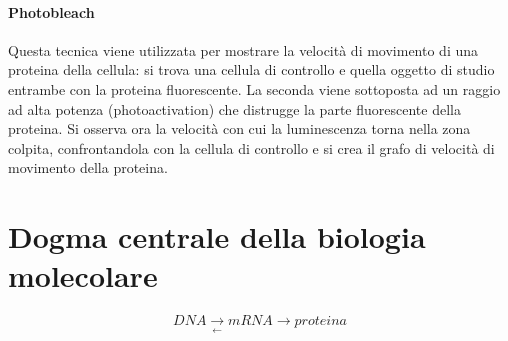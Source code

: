 \paragraph{Photobleach}
Questa tecnica viene utilizzata per mostrare la velocit\`a di movimento di una proteina della cellula: si trova una cellula di controllo e quella oggetto di 
studio entrambe con la proteina fluorescente. La seconda viene sottoposta ad un raggio ad alta potenza (photoactivation) che distrugge la parte fluorescente
della proteina. Si osserva ora la velocit\`a con cui la luminescenza torna nella zona colpita, confrontandola con la cellula di controllo e si crea il grafo
di velocit\`a di movimento della proteina.
\section{Dogma centrale della biologia molecolare}
$$DNA\xrightarrow[\leftarrow]{}mRNA\rightarrow proteina$$